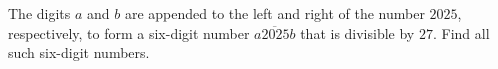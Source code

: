 The digits $a$ and $b$ are appended to the left and right of the number $2025$, respectively, to form a six-digit number $\overline{a2025b}$ that is divisible by $27$. Find all such six-digit numbers.
